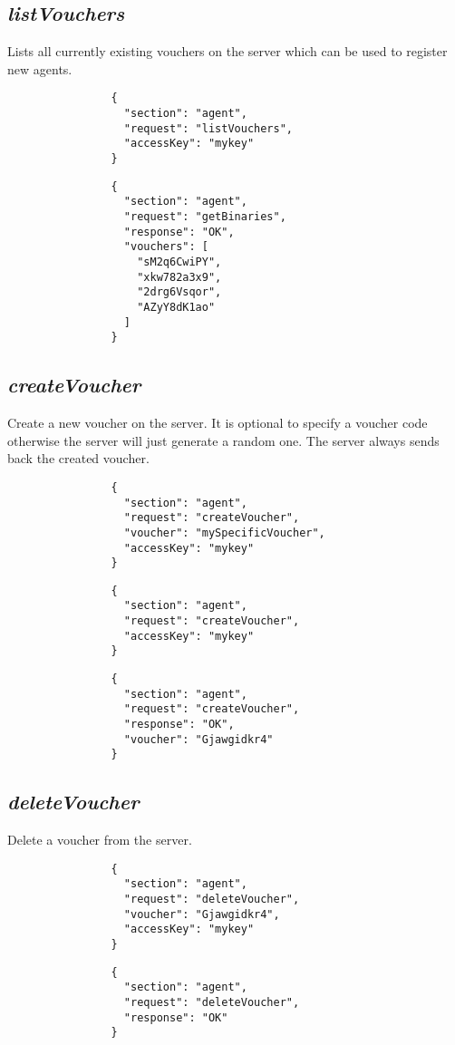 \documentclass{article}
\begin{document}
		\subsection*{\textit{listVouchers}}
			Lists all currently existing vouchers on the server which can be used to register new agents.
			{
				\color{blue}
				\begin{verbatim}
				{
				  "section": "agent",
				  "request": "listVouchers",
				  "accessKey": "mykey"
				}
				\end{verbatim}
			}
			{
				\color{OliveGreen}
				\begin{verbatim}
				{
				  "section": "agent",
				  "request": "getBinaries",
				  "response": "OK",
				  "vouchers": [
				    "sM2q6CwiPY",
				    "xkw782a3x9",
				    "2drg6Vsqor",
				    "AZyY8dK1ao"
				  ]
				}
				\end{verbatim}
			}
		\subsection*{\textit{createVoucher}}
			Create a new voucher on the server. It is optional to specify a voucher code otherwise the server will just generate a random one. The server always sends back the created voucher.
			{
				\color{blue}
				\begin{verbatim}
				{
				  "section": "agent",
				  "request": "createVoucher",
				  "voucher": "mySpecificVoucher",
				  "accessKey": "mykey"
				}
				\end{verbatim}
			}
			{
				\color{blue}
				\begin{verbatim}
				{
				  "section": "agent",
				  "request": "createVoucher",
				  "accessKey": "mykey"
				}
				\end{verbatim}
			}
			{
				\color{OliveGreen}
				\begin{verbatim}
				{
				  "section": "agent",
				  "request": "createVoucher",
				  "response": "OK",
				  "voucher": "Gjawgidkr4"
				}
				\end{verbatim}
			}
		\subsection*{\textit{deleteVoucher}}
			Delete a voucher from the server.
			{
				\color{blue}
				\begin{verbatim}
				{
				  "section": "agent",
				  "request": "deleteVoucher",
				  "voucher": "Gjawgidkr4",
				  "accessKey": "mykey"
				}
				\end{verbatim}
			}
			{
				\color{OliveGreen}
				\begin{verbatim}
				{
				  "section": "agent",
				  "request": "deleteVoucher",
				  "response": "OK"
				}
				\end{verbatim}
			}
\end{document}
